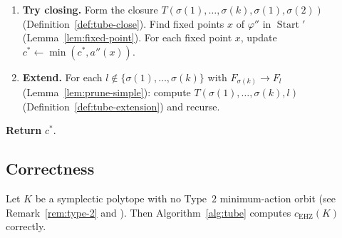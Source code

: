 \begin{algorithm}
\begin{enumerate}
\item \textbf{Try closing.}
  Form the closure $T(\sigma(1), \ldots, \sigma(k), \sigma(1), \sigma(2))$
  (Definition~\ref{def:tube-close}).
  Find fixed points $x$ of $\varphi''$ in $\operatorname{Start}'$
  (Lemma~\ref{lem:fixed-point}).
  For each fixed point $x$, update $c^* \leftarrow \min(c^*, a''(x))$.

\item \textbf{Extend.}
  For each $l \notin \{\sigma(1), \ldots, \sigma(k)\}$
  with $F_{\sigma(k)} \to F_l$
  (Lemma~\ref{lem:prune-simple}):
  compute $T(\sigma(1), \ldots, \sigma(k), l)$
  (Definition~\ref{def:tube-extension}) and recurse.
\end{enumerate}

\smallskip\noindent
\textbf{Return} $c^*$.
\end{algorithm}

\subsection{Correctness}\label{subsec:tube-correctness}

\begin{proposition}\label{prop:tube-correctness}
Let $K$ be a symplectic polytope with no Type~$2$ minimum-action orbit
(see Remark~\ref{rem:type-2} and \cite[Conj.~1.26]{CH2021}).
Then Algorithm~\ref{alg:tube} computes $c_{\mathrm{EHZ}}(K)$ correctly.
\end{proposition}

